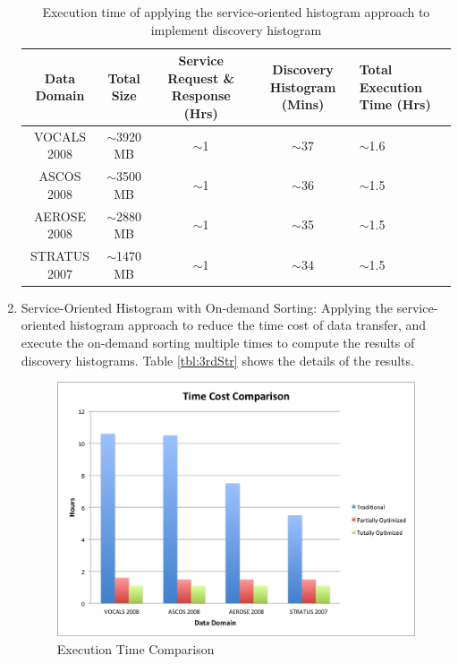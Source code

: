 \documentclass[times, 10pt,onecolumn]{article} %
\begin{document}
\begin{enumerate}
\begin{table}[!iht]
\centering
\begin{tabular}{|c|c|c|c|p{3cm}|}
\hline
\textbf{Data Domain} & \textbf{Total Size} & \textbf{ Service Request \& Response (Hrs)} & \textbf{Discovery Histogram (Mins) }& \textbf{Total Execution Time (Hrs) } \\ \hline
VOCALS 2008 &  $\sim$3920 MB & $\sim$1 & $\sim$37& $\sim$1.6\\ \hline
ASCOS 2008 & $\sim$3500 MB & $\sim$1 & $\sim$36& $\sim$1.5\\ \hline 
AEROSE 2008 & $\sim$2880 MB & $\sim$1 & $\sim$35&  $\sim$1.5 \\\hline 
STRATUS 2007 & $\sim$1470 MB & $\sim$1  & $\sim$34&  $\sim$1.5\\\hline
\end{tabular}
\caption{ Execution time of applying the service-oriented histogram approach to implement discovery histogram}
\label{tbl:2ndStr}
\end{table}

\item{Service-Oriented Histogram with On-demand Sorting:} Applying the service-oriented histogram approach to reduce the time cost of data transfer, and execute the on-demand sorting multiple times to compute the results of discovery histograms. Table \ref{tbl:3rdStr} shows the details of the results.

\begin{figure}[!iht]
\begin{center}
  \includegraphics[scale=0.5]{TimeComp.png}
  \caption{Execution Time Comparison}
  \label{fig:TCC}
\end{center}
\end{figure}


\end{enumerate}
\end{document}
